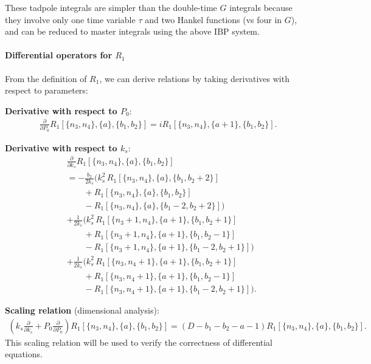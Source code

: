 \documentclass[a4paper,12pt]{article}
\newcommand{\n}{\nonumber}
\begin{document}
These tadpole integrals are simpler than the double-time $G$ integrals because they involve only one time variable $\tau$ and two Hankel functions (vs four in $G$), and can be reduced to master integrals using the above IBP system.



\paragraph{Differential operators for $R_1$}
From the definition of $R_1$, we can derive relations by taking derivatives with respect to parameters:

\textbf{Derivative with respect to $P_0$}:
\begin{align}
	\frac{\partial}{\partial P_0} R_1[\{n_3,n_4\},\{a\},\{b_1,b_2\}] = i R_1[\{n_3,n_4\},\{a+1\},\{b_1,b_2\}]. \label{eq:R1dP0}
\end{align}

\textbf{Derivative with respect to $k_s$}:
\begin{align}
	&\frac{\partial}{\partial k_s} R_1[\{n_3,n_4\},\{a\},\{b_1,b_2\}] \n\\
	&=-\frac{b_2}{2k_s}\Big(
	k_s^2\,R_1[\{n_3,n_4\},\{a\},\{b_1,b_2+2\}] \nonumber\\
	&\qquad
	+R_1[\{n_3,n_4\},\{a\},\{b_1,b_2\}] \nonumber\\
	&\qquad
	-R_1[\{n_3,n_4\},\{a\},\{b_1-2,b_2+2\}]
	\Big) \nonumber\\
	&+\frac{1}{2k_s}\Big(
	k_s^2\,R_1[\{n_3+1,n_4\},\{a+1\},\{b_1,b_2+1\}] \nonumber\\
	&\qquad
	+R_1[\{n_3+1,n_4\},\{a+1\},\{b_1,b_2-1\}] \nonumber\\
	&\qquad
	-R_1[\{n_3+1,n_4\},\{a+1\},\{b_1-2,b_2+1\}]
	\Big) \nonumber\\
	&+\frac{1}{2k_s}\Big(
	k_s^2\,R_1[\{n_3,n_4+1\},\{a+1\},\{b_1,b_2+1\}] \nonumber\\
	&\qquad
	+R_1[\{n_3,n_4+1\},\{a+1\},\{b_1,b_2-1\}] \nonumber\\
	&\qquad
	-R_1[\{n_3,n_4+1\},\{a+1\},\{b_1-2,b_2+1\}]
	\Big). \label{eq:R1dks}
\end{align}

\textbf{Scaling relation} (dimensional analysis):
\begin{align}
	\left( k_s \frac{\partial}{\partial k_s} + P_0 \frac{\partial}{\partial P_0} \right) R_1[\{n_3,n_4\},\{a\},\{b_1,b_2\}] = (D - b_1 - b_2 - a - 1) R_1[\{n_3,n_4\},\{a\},\{b_1,b_2\}]. \label{eq:R1scaling}
\end{align}
This scaling relation will be used to verify the correctness of differential equations.
\end{document}
